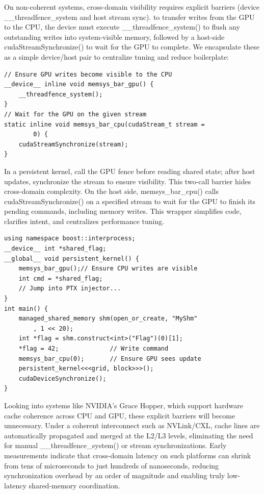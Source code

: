On non-coherent systems, cross-domain visibility requires explicit barriers (device \_\_threadfence\_system and host stream sync). to transfer writes from the GPU to the CPU, the device must execute \_\_threadfence\_system() to flush any outstanding writes into system‐visible memory, followed by a host-side cudaStreamSynchronize() to wait for the GPU to complete. We encapsulate these as a simple device/host pair to centralize tuning and reduce boilerplate:
\begin{verbatim}
// Ensure GPU writes become visible to the CPU
__device__ inline void memsys_bar_gpu() {
    __threadfence_system();
}
// Wait for the GPU on the given stream
static inline void memsys_bar_cpu(cudaStream_t stream =
        0) {
    cudaStreamSynchronize(stream);
}
\end{verbatim}
In a persistent kernel, call the GPU fence before reading shared state; after host updates, synchronize the stream to ensure visibility. This two-call barrier hides cross-domain complexity. On the host side, memsys\_bar\_cpu() calls cudaStreamSynchronize() on a specified stream to wait for the GPU to finish its pending commands, including memory writes. This wrapper simplifies code, clarifies intent, and centralizes performance tuning. 
\begin{verbatim}
using namespace boost::interprocess;
__device__ int *shared_flag;
__global__ void persistent_kernel() {
    memsys_bar_gpu();// Ensure CPU writes are visible
    int cmd = *shared_flag;
    // Jump into PTX injector...
}
int main() {
    managed_shared_memory shm(open_or_create, "MyShm"
        , 1 << 20);
    int *flag = shm.construct<int>("Flag")(0)[1];
    *flag = 42;              // Write command
    memsys_bar_cpu(0);       // Ensure GPU sees update
    persistent_kernel<<<grid, block>>>();
    cudaDeviceSynchronize();
}
\end{verbatim}
Looking into systems like NVIDIA's Grace Hopper, which support hardware cache coherence across CPU and GPU, these explicit barriers will become unnecessary. Under a coherent interconnect such as NVLink/CXL, cache lines are automatically propagated and merged at the L2/L3 levels, eliminating the need for manual \_\_threadfence\_system() or stream synchronizations. Early measurements indicate that cross-domain latency on such platforms can shrink from tens of microseconds to just hundreds of nanoseconds, reducing synchronization overhead by an order of magnitude and enabling truly low-latency shared-memory coordination.

